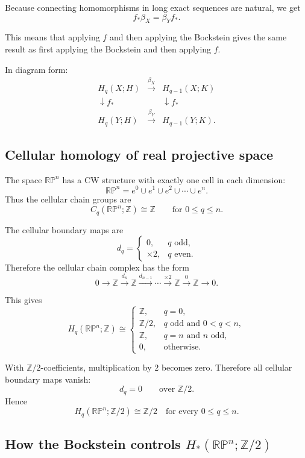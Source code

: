 \documentclass[12pt,a4paper]{article}
\theoremstyle{notespace}
\begin{document}
Because connecting homomorphisms in long exact sequences are natural, we get
\[
\boxed{
	f_*\beta_X=\beta_Y f_*.
}
\]

This means that applying \(f\) and then applying the Bockstein gives the same result as first applying the Bockstein and then applying \(f\).

In diagram form:
\[
\begin{array}{ccc}
	H_q(X;H) & \xrightarrow{\beta_X} & H_{q-1}(X;K) \\[1mm]
	\downarrow f_* && \downarrow f_* \\[1mm]
	H_q(Y;H) & \xrightarrow{\beta_Y} & H_{q-1}(Y;K).
\end{array}
\]

\subsection{Cellular homology of real projective space}

The space \(\mathbb{RP}^n\) has a CW structure with exactly one cell in each dimension:
\[
\mathbb{RP}^n
=
e^0\cup e^1\cup e^2\cup\cdots\cup e^n.
\]
Thus the cellular chain groups are
\[
C_q(\mathbb{RP}^n;\mathbb Z)\cong \mathbb Z
\qquad
\text{for }0\le q\le n.
\]

The cellular boundary maps are
\[
d_q=
\begin{cases}
	0, & q \text{ odd},\\[1mm]
	\times 2, & q \text{ even}.
\end{cases}
\]
Therefore the cellular chain complex has the form
\[
0
\longrightarrow
\mathbb Z
\xrightarrow{d_n}
\mathbb Z
\xrightarrow{d_{n-1}}
\cdots
\xrightarrow{\times 2}
\mathbb Z
\xrightarrow{0}
\mathbb Z
\longrightarrow
0.
\]

This gives
\[
H_q(\mathbb{RP}^n;\mathbb Z)
\cong
\begin{cases}
	\mathbb Z, & q=0,\\[1mm]
	\mathbb Z/2, & q \text{ odd and }0<q<n,\\[1mm]
	\mathbb Z, & q=n\text{ and }n\text{ odd},\\[1mm]
	0, & \text{otherwise}.
\end{cases}
\]

With \(\mathbb Z/2\)-coefficients, multiplication by \(2\) becomes zero. Therefore all cellular boundary maps vanish:
\[
d_q=0
\qquad
\text{over }\mathbb Z/2.
\]
Hence
\[
\boxed{
	H_q(\mathbb{RP}^n;\mathbb Z/2)\cong \mathbb Z/2
	\quad
	\text{for every }0\le q\le n.
}
\]

\subsection{How the Bockstein controls \(H_*(\mathbb{RP}^n;\mathbb Z/2)\)}
\end{document}
